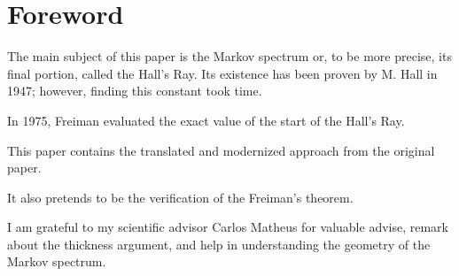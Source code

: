 \section{Foreword}

The main subject of this paper is the Markov spectrum or, to be more precise,
its final portion, called the Hall's Ray.
Its existence has been proven by M. Hall in 1947;
however, finding this constant took time.

In 1975, Freiman evaluated the exact value of the start of the Hall's Ray.

This paper contains the translated and modernized approach from the original paper.

It also pretends to be the verification of the Freiman's theorem.

I am grateful to my scientific advisor Carlos Matheus
for valuable advise, remark about the thickness argument,
and help in understanding the geometry of the Markov spectrum.
